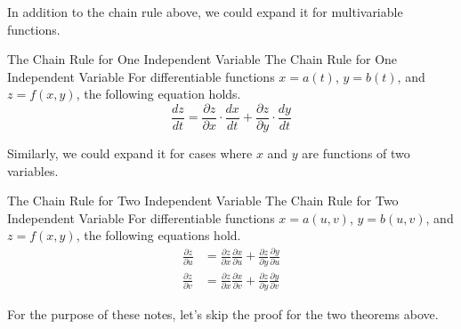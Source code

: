 \documentclass[../../main.tex]{subfiles}
\begin{document}
In addition to the chain rule above, we could expand it for
multivariable functions.

\begin{theorem}
{The Chain Rule for One Independent Variable}
{The Chain Rule for One Independent Variable}
For differentiable functions $x = a(t)$, $y = b(t)$, and
$z = f(x, y)$, the following equation holds.
\[
\frac{dz}{dt}
= \frac{\partial z}{\partial x} \cdot \frac{dx}{dt} +
    \frac{\partial z}{\partial y} \cdot \frac{dy}{dt}
\]
\end{theorem}

Similarly, we could expand it for cases where $x$ and $y$ are
functions of two variables.

\begin{theorem}
{The Chain Rule for Two Independent Variable}
{The Chain Rule for Two Independent Variable}
For differentiable functions $x = a(u, v)$, $y = b(u, v)$,
and $z = f(x, y)$, the following equations hold.
\begin{align*}
    \frac{\partial z}{\partial u}
    &= \frac{\partial z}{\partial x} \frac{\partial x}{\partial u} +
        \frac{\partial z}{\partial y} \frac{\partial y}{\partial u} \\
    \frac{\partial z}{\partial v}
    &= \frac{\partial z}{\partial x} \frac{\partial x}{\partial v} +
        \frac{\partial z}{\partial y} \frac{\partial y}{\partial v}
\end{align*}
\end{theorem}

For the purpose of these notes, let's skip the proof for the two
theorems above.
\end{document}
